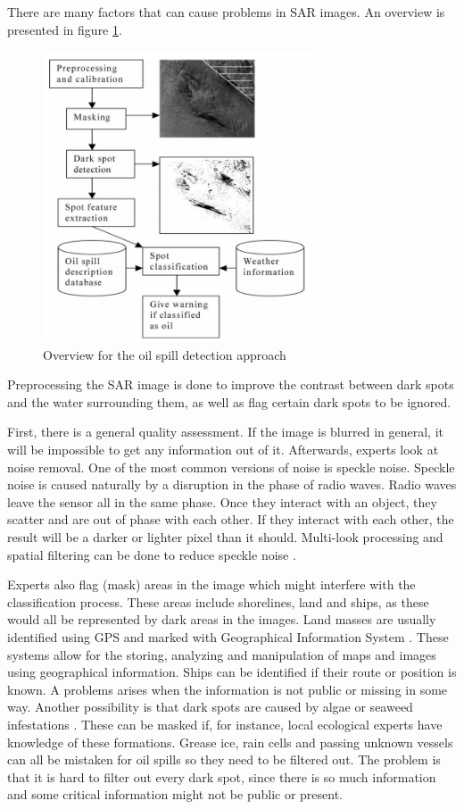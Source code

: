 There are many factors that can cause problems in SAR images. An overview is presented in figure \ref{fig:overview}.
\begin{figure}[H]
    \includegraphics[width=80mm]{./img/detection_diagram.png}
    \caption{Overview for the oil spill detection approach \cite{Solberg200745}}
    \label{fig:overview}
\end{figure}
Preprocessing the SAR image is done to improve the contrast between dark spots and the water surrounding them, as well as flag certain dark spots to be ignored. 

First, there is a general quality assessment. If the image is blurred in general, it will be impossible to get any information out of it. Afterwards, experts look at noise removal. One of the most common versions of noise is speckle noise. Speckle noise is caused naturally by a disruption in the phase of radio waves. Radio waves leave the sensor all in the same phase. Once they interact with an object, they scatter and are out of phase with each other. If they interact with each other, the result will be a darker or lighter pixel than it should. Multi-look processing and spatial filtering can be done to reduce speckle noise \cite{simard1998analysis}.

Experts also flag (mask) areas in the image which might interfere with the classification process. These areas include shorelines, land and ships, as these would all be represented by dark areas in the images. Land masses are usually identified using GPS and marked with Geographical Information System \cite{star1990geographic}. These systems allow for the storing, analyzing and manipulation of maps and images using geographical information. Ships can be identified if their route or position is known. A problems arises when the information is not public or missing in some way.
Another possibility is that dark spots are caused by algae or seaweed infestations \cite{fingas2014review}. These can be masked if, for instance, local ecological experts have knowledge of these formations. Grease ice, rain cells and passing unknown vessels can all be mistaken for oil spills \cite{Brekke200595} so they need to be filtered out. The problem is that it is hard to filter out every dark spot, since there is so much information and some critical information might not be public or present.

